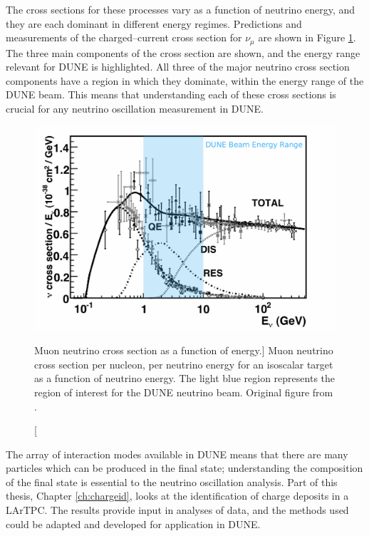 \medskip\noindent
The cross sections for these processes vary as a function of neutrino energy,
and they are each dominant in different energy regimes. Predictions and 
measurements of the charged--current cross section for $\nu_\mu$ are shown in 
Figure \ref{fig:numu_xsec}. The three main components of the cross section are 
shown, and the energy range relevant for DUNE is 
highlighted\cite{Formaggio:2013kya}.  All three of the major neutrino cross 
section components have a region in which they dominate, within the energy 
range of the DUNE beam. This means that understanding each of these cross 
sections is crucial for any neutrino oscillation measurement in DUNE. 

\begin{figure}
	\centering
	\includegraphics[width=\textwidth]{figures/numu_xsec.pdf}
	\caption
	[Muon neutrino cross section as a function of energy.]
	{Muon neutrino cross section per nucleon, per neutrino energy for an isoscalar
	target as a function of neutrino energy. The light blue region represents the 
	region of interest for the DUNE neutrino beam. Original figure from 
	\cite{Formaggio:2013kya}.}
	\label{fig:numu_xsec}
\end{figure}

The array of interaction modes available in DUNE means that there are many
particles which can be produced in the final state; understanding 
the composition of the final state is essential to the neutrino oscillation 
analysis. Part of this thesis, Chapter \ref{ch:chargeid}, looks at
the identification of charge deposits in a LArTPC. The results provide input 
in analyses of \protodune{} data, and the methods used could be adapted and 
developed for application in DUNE. 

